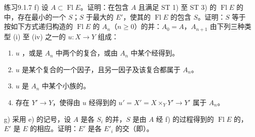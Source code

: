 \begin{SGAresult}{练习}{9.1.7}
f) 设 $A\subset\operatorname{Fl}E$。证明：在包含 $A$ 且满足 ST 1) 至 ST 3) 的 $\operatorname{Fl}E$ 的中，存在最小的一个 $S$；$S$ 于最大的 $E'$，使其的 $\operatorname{Fl}E$ 的包含 $S$。证明：$S$ 等于按如下方式递归构造的 $\operatorname{Fl}E$ 的 $A_n$（$n\ge0$）的并：$A_0=A$，$A_{n+1}$ 由下列三种类型 (i) 至 (iv) 之一的 $u:X\to Y$ 组成：
\begin{enumerate}[label=(\roman*)]
\item $u$ ，或是 $A_n$ 中两个的复合，或由 $A_n$ 中某个经得到。
\item $u$ 是某个复合的一个因子，且另一因子及该复合都属于 $A_n$。
\item $u$ 是 $A_n$ 中某个小族的。
\item 存在 $Y'\to Y$，使得由 $u$ 经得到的 $u'=X'=X\times_Y Y'\to Y'$ 属于 $A_n$。
\end{enumerate}
g) 采用 e) 的记号，设 $A$ 是各 $S_i$ 的并，$S$ 是由 $A$ 经 f) 的过程得到的 $\operatorname{Fl}E$ 的，$E'$ 是 $E$ 的相应。证明：$E'$ 是各 $E'_i$ 的交（即）。
\end{SGAresult}
